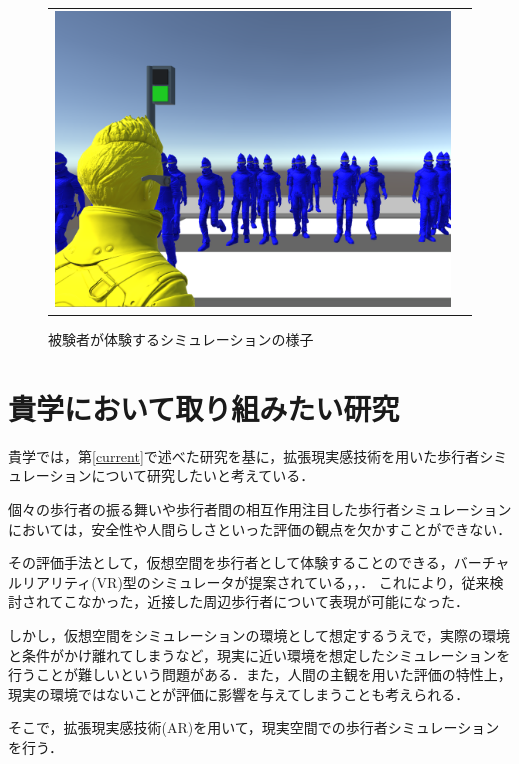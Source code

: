 \documentclass[twocolumn]{jarticle}%
\begin{document}
\begin{figure}[H]
\begin{tabular}{cc}
\begin{minipage}[t]{0.45\hsize}
        \includegraphics[keepaspectratio, scale=0.1]{images/user_view_mini.JPG}
        \caption{被験者が体験するシミュレーションの様子}
        \label{fig:user_view}
      \end{minipage}
    \end{tabular}
  \end{figure}

\section{貴学において取り組みたい研究}\label{want}
貴学では，第\ref{current}で述べた研究を基に，拡張現実感技術を用いた歩行者シミュレーションについて研究したいと考えている．

個々の歩行者の振る舞いや歩行者間の相互作用注目した歩行者シミュレーションにおいては，安全性や人間らしさといった評価の観点を欠かすことができない．

その評価手法として，仮想空間を歩行者として体験することのできる，バーチャルリアリティ(VR)型のシミュレータが提案されている\cite{Iryo-VRE}，\cite{Iryo-Appli}，\cite{Iryo-VRMicroPM}．
これにより，従来検討されてこなかった，近接した周辺歩行者について表現が可能になった．

しかし，仮想空間をシミュレーションの環境として想定するうえで，実際の環境と条件がかけ離れてしまうなど，現実に近い環境を想定したシミュレーションを行うことが難しいという問題がある．また，人間の主観を用いた評価の特性上，現実の環境ではないことが評価に影響を与えてしまうことも考えられる．

そこで，拡張現実感技術(AR)を用いて，現実空間での歩行者シミュレーションを行う．
\end{document}
